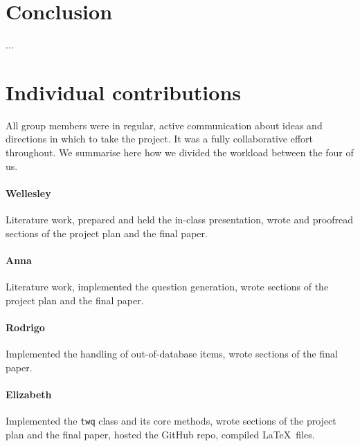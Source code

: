 \documentclass[11pt,a4paper]{article}
\begin{document}
\section{Conclusion}
\label{sec:concl}

...




\appendix

\section{Individual contributions}
\label{app:contributions}

All group members were in regular, active communication about ideas and directions in which to take the project.
It was a fully collaborative effort throughout.
We summarise here how we divided the workload between the four of us.

\paragraph{Wellesley} Literature work, prepared and held the in-class presentation, wrote and proofread sections of the project plan and the final paper.

\paragraph{Anna} Literature work, implemented the question generation, wrote sections of the project plan and the final paper.

\paragraph{Rodrigo} Implemented the handling of out-of-database items, wrote sections of the final paper.

\paragraph{Elizabeth} Implemented the \texttt{twq} class and its core methods, wrote sections of the project plan and the final paper, hosted the GitHub repo, compiled \LaTeX\ files.
\end{document}
